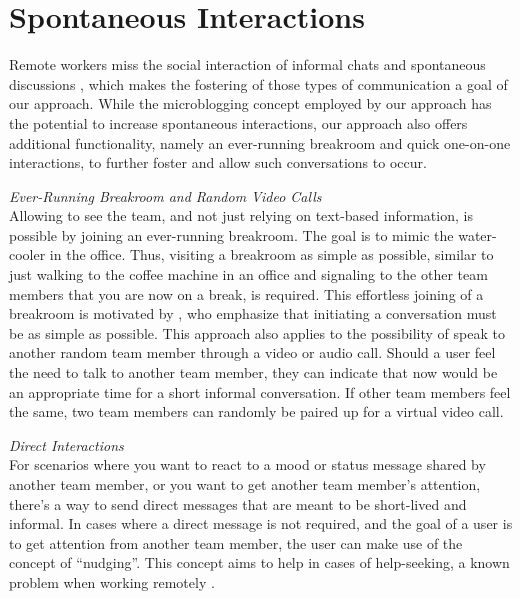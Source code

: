 \section{Spontaneous Interactions}
Remote workers miss the social interaction of informal chats and spontaneous discussions \autocite{cooper2002telecommuting}, which makes the fostering of those types of communication a goal of our approach. While the microblogging concept employed by our approach has the potential to increase spontaneous interactions, our approach also offers additional functionality, namely an ever-running breakroom and quick one-on-one interactions, to further foster and allow such conversations to occur.

\medskip\noindent\textit{Ever-Running Breakroom and Random Video Calls} \\
Allowing to see the team, and not just relying on text-based information, is possible by joining an ever-running breakroom. The goal is to mimic the water-cooler in the office. Thus, visiting a breakroom as simple as possible, similar to just walking to the coffee machine in an office and signaling to the other team members that you are now on a break, is required. This effortless joining of a breakroom is motivated by \textcite{chang2007out}, who emphasize that initiating a conversation must be as simple as possible. This approach also applies to the possibility of speak to another random team member through a video or audio call. Should a user feel the need to talk to another team member, they can indicate that now would be an appropriate time for a short informal conversation. If other team members feel the same, two team members can randomly be paired up for a virtual video call.

\medskip\noindent\textit{Direct Interactions} \\
For scenarios where you want to react to a mood or status message shared by another team member, or you want to get another team member's attention, there's a way to send direct messages that are meant to be short-lived and informal. In cases where a direct message is not required, and the goal of a user is to get attention from another team member, the user can make use of the concept of \enquote{nudging}. This concept aims to help in cases of help-seeking, a known problem when working remotely \autocite{herbsleb2003empirical}.
